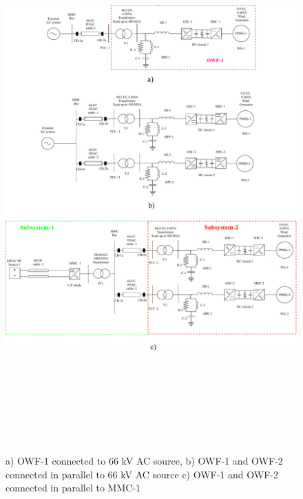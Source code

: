 





\begin{figure}[H]
    \includegraphics[height = 21cm,width = \textwidth]{Diagrams/Chapter_4/Steps_for_Scaling.pdf}
    \caption{a) OWF-1 connected to 66 kV AC source, b) OWF-1 and OWF-2 connected in parallel to 66 kV AC source c) OWF-1 and OWF-2 connected in parallel to MMC-1}
    \label{fig:Steps_for_Scaling}
\end{figure}

